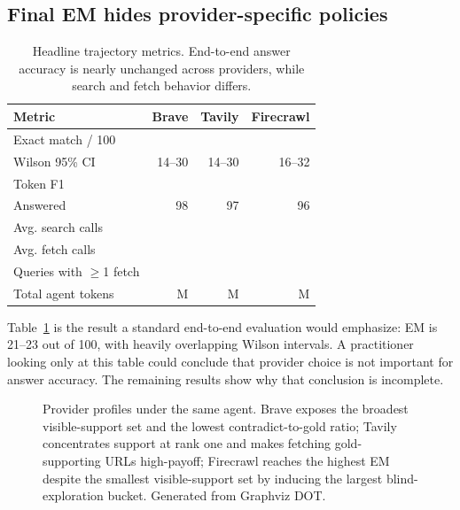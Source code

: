 \documentclass[11pt]{article}
\begin{document}
\subsection{Final EM hides provider-specific policies}

\begin{table}[t]
\centering
\small
\begin{tabular}{lrrr}
\toprule
\textbf{Metric} & \textbf{Brave} & \textbf{Tavily} & \textbf{Firecrawl} \\
\midrule
Exact match / 100 & \BraveEM{} & \TavilyEM{} & \FirecrawlEM{} \\
Wilson 95\% CI & 14--30 & 14--30 & 16--32 \\
Token F1 & \BraveFone{} & \TavilyFone{} & \FirecrawlFone{} \\
Answered & 98 & 97 & 96 \\
\midrule
Avg. search calls & \BraveSearchAvg{} & \TavilySearchAvg{} & \FirecrawlSearchAvg{} \\
Avg. fetch calls & \BraveFetchAvg{} & \TavilyFetchAvg{} & \FirecrawlFetchAvg{} \\
Queries with $\geq$1 fetch & \BraveFetchedPct{} & \TavilyFetchedPct{} & \FirecrawlFetchedPct{} \\
Total agent tokens & \BraveTokensM{}M & \TavilyTokensM{}M & \FirecrawlTokensM{}M \\
\bottomrule
\end{tabular}
\caption{Headline trajectory metrics. End-to-end answer accuracy is nearly unchanged across providers, while search and fetch behavior differs.}
\label{tab:headline}
\end{table}

Table~\ref{tab:headline} is the result a standard end-to-end evaluation would emphasize: EM is 21--23 out of 100, with heavily overlapping Wilson intervals. A practitioner looking only at this table could conclude that provider choice is not important for answer accuracy. The remaining results show why that conclusion is incomplete.

\begin{figure}[t]
\centering
\resizebox{0.98\textwidth}{!}{}
\caption{Provider profiles under the same agent. Brave exposes the broadest visible-support set and the lowest contradict-to-gold ratio; Tavily concentrates support at rank one and makes fetching gold-supporting URLs high-payoff; Firecrawl reaches the highest EM despite the smallest visible-support set by inducing the largest blind-exploration bucket. Generated from Graphviz DOT.}
\label{fig:provider-profiles}
\end{figure}
\end{document}
